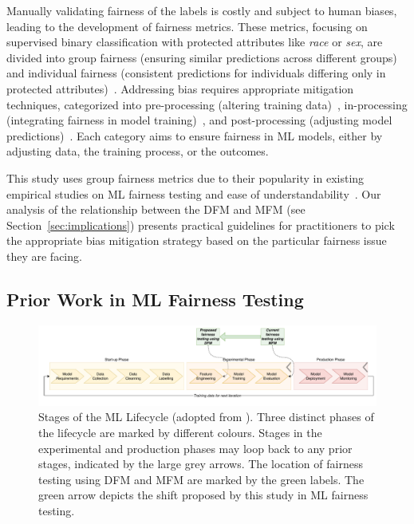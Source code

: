 \documentclass[sigconf,review]{acmart}
\begin{document}
Manually validating fairness of the labels is costly and subject to
human biases, leading to the development of fairness metrics. These
metrics, focusing on supervised binary classification with protected
attributes like \emph{race} or \emph{sex}, are divided into group
fairness (ensuring similar predictions across different groups) and
individual fairness (consistent predictions for individuals differing
only in protected
attributes)~\cite{mitchell2021algorithmic,barocas2019fairness,hardt2016equality}.
Addressing bias requires appropriate mitigation techniques,
categorized into pre-processing (altering training
data)~\cite{feldman2015certifying,zemel2013learning},
in-processing (integrating fairness in model
training)~\cite{zhang2018mitigating,agarwal2018reductions,kearns2018preventing},
and post-processing (adjusting model
predictions)~\cite{pleiss2017fairness,hardt2016equality,kamiran2012decision}.
Each category aims to ensure fairness in ML models, either by
adjusting data, the training process, or the outcomes.

This study uses group fairness metrics due to their popularity in
existing empirical studies on ML fairness testing and ease of
understandability \cite{zhang2021ignorance,biswas2020machine,biswas2021fair,hort2021fairea}.
Our analysis of the relationship between the DFM and MFM (see
Section \ref{sec:implications}) presents practical guidelines for
practitioners to pick the appropriate bias mitigation strategy based
on the particular fairness issue they are facing.
\subsection{Prior Work in ML Fairness Testing}\label{sec:prior-work}

\begin{figure}
  \centering
  \includegraphics[width=0.8\linewidth]{ml-lifecycle.pdf}
  \caption{Stages of the ML Lifecycle (adopted from
    \cite{amershi2019software,breck2019data}). Three
    distinct phases of the lifecycle are marked by different colours.
    Stages in the experimental and production phases may loop back to
    any prior stages, indicated by the large grey arrows. The location
    of fairness testing using DFM and MFM are marked by the green
    labels. The green arrow depicts the shift proposed by this study
    in ML fairness testing. }
  \label{fig:ml-lifecycle}
\end{figure}
\end{document}
